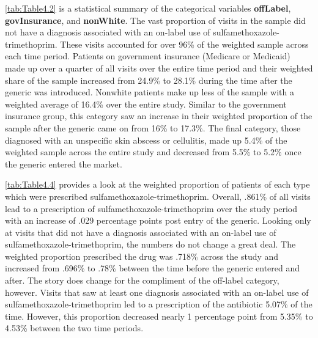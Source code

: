 \begin{landscape}

\end{landscape} 
\indent \autoref{tab:Table4.2} is a statistical summary of the categorical variables \textbf{offLabel}, \textbf{govInsurance}, and \textbf{nonWhite}. The vast proportion of visits in the sample did not have a diagnosis associated with an on-label use of sulfamethoxazole-trimethoprim. These visits accounted for over 96\% of the weighted sample across each time period. Patients on government insurance (Medicare or Medicaid) made up over a quarter of all visits over the entire time period and their weighted share of the sample increased from 24.9\% to 28.1\% during the time after the generic was introduced. Nonwhite patients make up less of the sample with a weighted average of 16.4\% over the entire study. Similar to the government insurance group, this category saw an increase in their weighted proportion of the sample after the generic came on from 16\% to 17.3\%. The final category, those diagnosed with an unspecific skin abscess or cellulitis, made up 5.4\% of the weighted sample across the entire study and decreased from 5.5\% to 5.2\% once the generic entered the market.
\begin{landscape}

\end{landscape}
\autoref{tab:Table4.4} provides a look at the weighted proportion of patients of each type which were prescribed sulfamethoxazole-trimethoprim. Overall, .861\% of all visits lead to a prescription of sulfamethoxazole-trimethoprim over the study period with an increase of .029 percentage points post entry of the generic. Looking only at visits that did not have a diagnosis associated with an on-label use of sulfamethoxazole-trimethoprim, the numbers do not change a great deal. The weighted proportion prescribed the drug was .718\% across the study and increased from .696\% to .78\% between the time before the generic entered and after. The story does change for the compliment of the off-label category, however. Visits that saw at least one diagnosis associated with an on-label use of sulfamethoxazole-trimethoprim led to a prescription of the antibiotic 5.07\% of the time. However, this proportion decreased nearly 1 percentage point from 5.35\% to 4.53\% between the two time periods.\\
